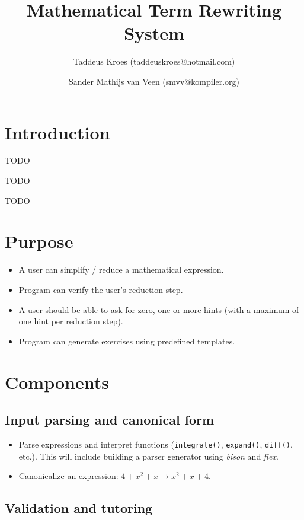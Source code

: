 \documentclass[10pt,a4paper]{article}
\title{Mathematical Term Rewriting System}
\author{Taddeus Kroes (taddeuskroes@hotmail.com)
    \and Sander Mathijs van Veen (smvv@kompiler.org)}
\begin{document}
\maketitle

\section{Introduction}

TODO

TODO

TODO

\section{Purpose}

\begin{itemize}
    \item A user can simplify / reduce a mathematical expression.
    \item Program can verify the user's reduction step.
    \item A user should be able to ask for zero, one or more hints (with a
    maximum of one hint per reduction step).
    \item Program can generate exercises using predefined templates.
\end{itemize}

\section{Components}

\subsection{Input parsing and canonical form}

\begin{itemize}
    \item Parse expressions and interpret functions (\texttt{integrate()},
    \texttt{expand()}, \texttt{diff()}, etc.). This will include building a
    parser generator using \emph{bison} and \emph{flex}.
    \item Canonicalize an expression: $4 + x^2 + x \rightarrow x^2 + x + 4$.
\end{itemize}

\subsection{Validation and tutoring}
\end{document}
